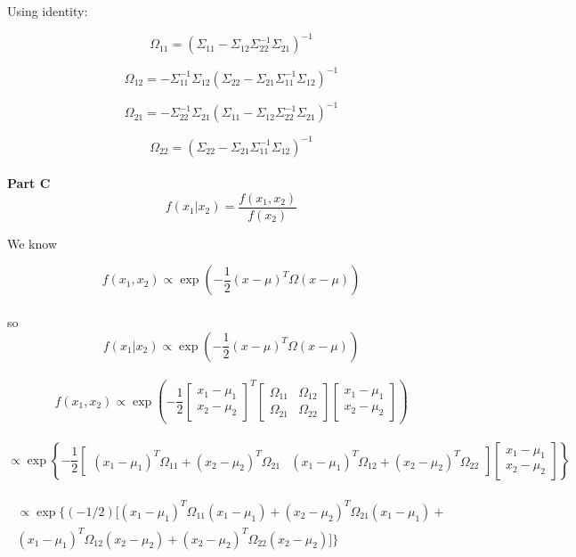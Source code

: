 \documentclass[12pt]{amsart}
\begin{document}
Using identity:


$$ \Omega_{11} = (\Sigma_{11}-\Sigma_{12}\Sigma_{22}^{-1}\Sigma_{21})^{-1} $$

$$ \Omega_{12} = -\Sigma_{11}^{-1}\Sigma_{12}(\Sigma_{22}-\Sigma_{21}\Sigma_{11}^{-1} \Sigma_{12})^{-1}              $$

$$ \Omega_{21} = -\Sigma_{22}^{-1}\Sigma_{21} (\Sigma_{11}-\Sigma_{12}\Sigma_{22}^{-1}\Sigma_{21})^{-1}       $$

$$ \Omega_{22} = (\Sigma_{22}-\Sigma_{21}\Sigma_{11}^{-1} \Sigma_{12})^{-1}              $$\\


{\bf Part C}\\
\bigskip
$$f(x_1|x_2) = \frac{f(x_1, x_2)}{f(x_2)}$$ 

We know 


$$f(x_1,x_2) \propto   \exp\left(-\frac{1}{2} (x - \mu)^T\Omega(x -\mu)\right)  $$\\

so
 $$f(x_1|x_2) \propto  \exp\left(-\frac{1}{2} (x - \mu)^T\Omega(x -\mu)\right) $$\\
 
 $$f(x_1,x_2) \propto   \exp\left(-\frac{1}{2}\begin{bmatrix}
x_1 - \mu_1 \\
x_2 - \mu_2 
\end{bmatrix}^T \begin{bmatrix}
\Omega_{11} & \Omega_{12} \\
\Omega_{21} & \Omega_{22} 
\end{bmatrix}  \begin{bmatrix}
x_1 - \mu_1 \\
x_2 - \mu_2 
\end{bmatrix}\right)  $$\\
  
$$\propto \exp\left\{ -\frac{1}{2}\begin{bmatrix} (x_1-\mu_1)^T\Omega_{11} + (x_2-\mu_2)^T\Omega_{21}& (x_1-\mu_1)^T\Omega_{12} + (x_2-\mu_2)^T\Omega_{22}\end{bmatrix} \begin{bmatrix}
x_1 - \mu_1 \\
x_2 - \mu_2 
\end{bmatrix} \right \}$$\\

\begin{equation*}
\begin{split}
\propto \exp \{ (-1/2)[(x_1-\mu_1)^T\Omega_{11}(x_1 - \mu_1) +(x_2-\mu_2)^T\Omega_{21}(x_1 - \mu_1) + \\ (x_1-\mu_1)^T\Omega_{12}(x_2 - \mu_2 ) +(x_2-\mu_2)^T\Omega_{22}(x_2 - \mu_2 )]\}
\end{split}
\end{equation*}\\
\end{document}
